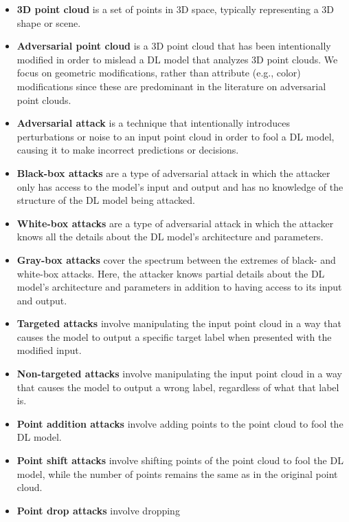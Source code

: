 \documentclass{ieeeaccess}
\begin{document}
\begin{itemize}

\item \textbf{3D point cloud} is a set of %
points in 3D space, typically representing a 3D shape or scene.
\item \textbf{Adversarial point cloud} is a 3D point cloud that has been intentionally modified in order to mislead a DL model that analyzes 3D point clouds. We focus on geometric modifications, rather than attribute (e.g., color) modifications since these are predominant in the literature on adversarial point clouds.
\item \textbf{Adversarial attack} is a technique that intentionally introduces perturbations or noise to an input point cloud in order to fool a DL model, causing it to make incorrect predictions or decisions.
\item \textbf{Black-box attacks} are a type of adversarial attack in which the attacker only has access to the model's input and output and has no knowledge of the structure of the DL model being attacked.
\item \textbf{White-box attacks} are a type of adversarial attack in which the attacker knows all the details about the DL model’s architecture and parameters.
\item \textbf{Gray-box attacks} cover the spectrum between the extremes of black- and white-box attacks. Here, the attacker knows partial details about the DL model’s architecture and parameters in addition to having access to its input and output.
\item \textbf{Targeted attacks} involve manipulating the input point cloud in a way that causes the model to output %
a specific target label when presented with the modified input.
\item \textbf{Non-targeted attacks} involve manipulating the input point cloud in a way that causes the model to %
output a wrong label, regardless of what that label is.
\item \textbf{Point addition attacks} involve adding %
points to the point cloud %
to fool the DL model.
\item \textbf{Point shift attacks} involve shifting points of the point cloud to fool the DL model, while the number of points remains the same as in the original point cloud.
\item \textbf{Point drop attacks} involve dropping %

\end{itemize}
\end{document}
